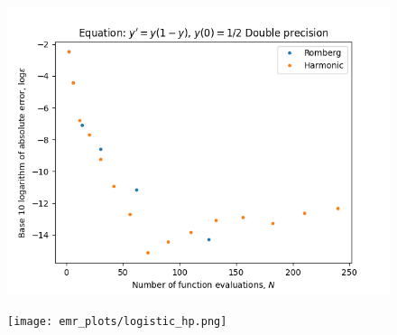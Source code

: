 \begin{figure}[H]
\centering
\begin{minipage}{0.45\textwidth}
\centering
\includegraphics[scale=0.45]{emr_plots/logistic.png}
\end{minipage}
\begin{minipage}{0.45\textwidth}
\centering
\texttt{[image: emr\_plots/logistic\_hp.png]}
\end{minipage}
\end{figure}

